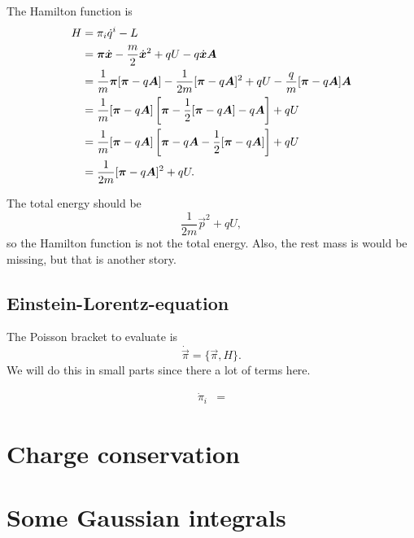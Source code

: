 \documentclass[11pt, english, fleqn, DIV=15, headinclude, BCOR=1cm]{scrartcl}
\begin{document}
The Hamilton function is
\begin{align*}
    H
    &= \pi_i \dot q^i - L \\
    &= \boldsymbol{\pi} \dot{\boldsymbol{x}} - \frac m2 \dot{\boldsymbol{x}}^2 + qU - q \dot{\boldsymbol{x}}
    \boldsymbol{A} \\
    &= \frac 1m \boldsymbol{\pi} [\boldsymbol{\pi} - q \boldsymbol{A}] - \frac1{2m} [\boldsymbol{\pi} - q \boldsymbol{A}]^2 + qU -
    \frac qm [\boldsymbol{\pi} - q \boldsymbol{A}] \boldsymbol{A} \\
    &= \frac 1m [\boldsymbol{\pi} - q \boldsymbol{A}] \left[ \boldsymbol{\pi} - \frac12 [\boldsymbol{\pi} - q \boldsymbol{A}] -
    q \boldsymbol{A} \right] + qU \\
    &= \frac 1m [\boldsymbol{\pi} - q \boldsymbol{A}] \left[ \boldsymbol{\pi} -
    q \boldsymbol{A} - \frac12 [\boldsymbol{\pi} - q \boldsymbol{A}] \right] + qU \\
    &= \frac 1{2m} [\boldsymbol{\pi} - q \boldsymbol{A}]^2 + qU.
\end{align*}

The total energy should be
\[
    \frac{1}{2m} \vec p^2 + qU,
\]
so the Hamilton function is not the total energy. Also, the rest mass is
would be missing, but that is another story. 

\subsection{Einstein-Lorentz-equation}

The Poisson bracket to evaluate is
\[
    \dot{\vec \pi} = \{\vec \pi, H\}.
\]
We will do this in small parts since there a lot of terms here.

\begin{align*}
    \dot \pi_i
    &=
\end{align*}

\section{Charge conservation} %

\section{Some Gaussian integrals} %
\end{document}
